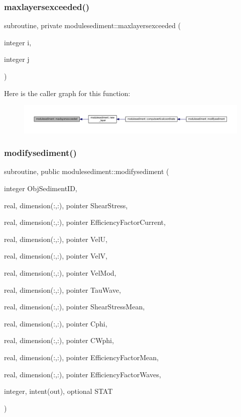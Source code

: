 \subsubsection{\texorpdfstring{maxlayersexceeded()}{maxlayersexceeded()}}
{\footnotesize\ttfamily subroutine, private modulesediment\+::maxlayersexceeded (\begin{DoxyParamCaption}\item[{integer}]{i,  }\item[{integer}]{j }\end{DoxyParamCaption})\hspace{0.3cm}{\ttfamily [private]}}

Here is the caller graph for this function\+:\nopagebreak
\begin{figure}[H]
\begin{center}
\leavevmode
\includegraphics[width=350pt]{namespacemodulesediment_aac53266b3dac9076f1df37c49e676383_icgraph}
\end{center}
\end{figure}
\mbox{\label{namespacemodulesediment_a8bd56ac218e3c51dd03eb2967d7e9398}} 
\subsubsection{\texorpdfstring{modifysediment()}{modifysediment()}}
{\footnotesize\ttfamily subroutine, public modulesediment\+::modifysediment (\begin{DoxyParamCaption}\item[{integer}]{Obj\+Sediment\+ID,  }\item[{real, dimension(\+:,\+:), pointer}]{Shear\+Stress,  }\item[{real, dimension(\+:,\+:), pointer}]{Efficiency\+Factor\+Current,  }\item[{real, dimension(\+:,\+:), pointer}]{VelU,  }\item[{real, dimension(\+:,\+:), pointer}]{VelV,  }\item[{real, dimension(\+:,\+:), pointer}]{Vel\+Mod,  }\item[{real, dimension(\+:,\+:), pointer}]{Tau\+Wave,  }\item[{real, dimension(\+:,\+:), pointer}]{Shear\+Stress\+Mean,  }\item[{real, dimension(\+:,\+:), pointer}]{Cphi,  }\item[{real, dimension(\+:,\+:), pointer}]{C\+Wphi,  }\item[{real, dimension(\+:,\+:), pointer}]{Efficiency\+Factor\+Mean,  }\item[{real, dimension(\+:,\+:), pointer}]{Efficiency\+Factor\+Waves,  }\item[{integer, intent(out), optional}]{S\+T\+AT }\end{DoxyParamCaption})}

